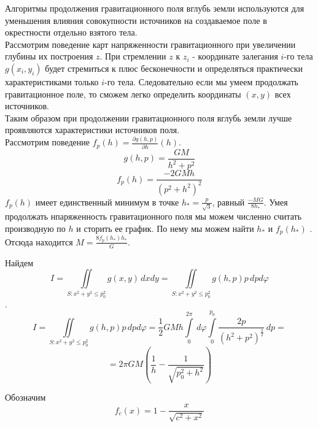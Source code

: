 \documentclass[12pt]{article}
\begin{document}
Алгоритмы продолжения гравитационного поля вглубь земли используются для уменьшения влияния совокупности источников на создаваемое поле в окрестности отдельно взятого тела.\\
\newline
Рассмотрим поведение карт напряженности гравитационного при увеличении глубины их построения $z$.
При стремлении $z$ к $z_{i}$ - координате залегания $i$-го тела $g(x_i,y_i)$ будет стремиться к плюс бесконечности и определяться практически характеристиками только $i$-го тела.
Следовательно если мы умеем продолжать гравитационное поле, то сможем легко определить координаты $(x,y)$ всех источников.\\
\newline
Таким образом при продолжении гравитационного поля вглубь земли лучше проявляются характеристики источников поля.\\

Рассмотрим поведение $f_{p}(h)=\displaystyle{\frac{{\partial}g(h,p)}{{\partial}h}}(h)$.
\[g(h,p)=\frac{GM}{h^2+p^2}\]
\[f_p(h)=\frac{-2GMh}{(p^2+h^2)^2}\]
$f_p(h)$ имеет единственный минимум в точке $\displaystyle{h_{*}=\frac{p}{\sqrt{3}}}$, равный $\displaystyle\frac{-MG}{8h_{*}}$.
Умея продолжать нпаряженность гравитационного поля мы можем численно считать производную по $h$ и сторить ее график. По нему мы можем найти $h_{*}$
и $f_p(h_{*})$ . Отсюда находится $M=\displaystyle\frac{8f_p(h_{*})h_{*}}{G}$.

Найдем \[I = \iint\limits_{S:x^2+y^2{\leq}p_0^2} g(x,y) \,dxdy = \iint\limits_{S:x^2+y^2{\leq}p_0^2} g(h,p) p\,dpd{\varphi} \].
 \[I = \iint\limits_{S:x^2+y^2{\leq}p_0^2} g(h,p) p\,dpd{\varphi} = \frac{1}{2}GMh{\int\limits_{0}^{2\pi}\,d{\varphi}}{\int\limits_{0}^{p_0}\frac{2p}{(h^2+p^2)^{\frac{3}{2}}}\,dp}=\]
\[=2{\pi}GM\left(\frac{1}{h}-\frac{1}{\sqrt{p_0^2+h^2}} \right)\]

Обозначим $$f_c(x)=1-\frac{x}{\sqrt{c^2+x^2}}$$
\end{document}
